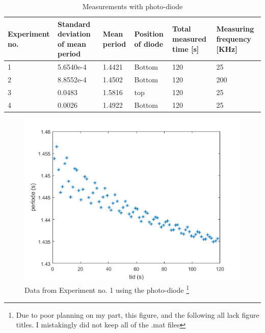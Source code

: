 \documentclass[%
 reprint,
 amsmath,amssymb,
 aps,
]{revtex4-1}
\begin{document}
        \begin{table}[h] %
            \caption{Measurements with photo-diode}
            \label{tab:photodiode}
            \begin{tabular}{| p{1.6cm} | p{1.4cm} | p{1.1cm} | p{1.3cm} | p{1.3cm} | p{1.5cm} |}
                \hline
                Experiment no. & Standard deviation of mean period & Mean period & Position of diode & Total measured time [s] & Measuring frequency [KHz] \\ \hline
                1 & 5.6540e-4 & 1.4421 & Bottom & 120 & 25 \\ \hline
                2 & 8.8552e-4 & 1.4502 & Bottom & 120 & 200 \\ \hline
                3 & 0.0483 & 1.5816 & top & 120 & 25 \\ \hline
                4 & 0.0026 & 1.4922 & Bottom & 120 & 25 \\ \hline
            \end{tabular}
        \end{table}
        
        \begin{figure}[h!]
        	\center
        	\includegraphics[scale=0.6]{forsok1fig1}
        	\caption{Data from Experiment no. 1 using the photo-diode
        	\footnote{Due to poor planning on my part, this figure, and the following all lack figure titles. I mistakingly did not keep all of the .mat files
        	}}
            \label{fig:data1}
        \end{figure}
\end{document}
